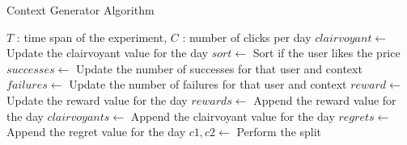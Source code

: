 \begin{algorithm}
	\caption{Context Generator Algorithm}
	\begin{algorithmic}[1]
		\renewcommand{\algorithmicrequire}{\textbf{Input:}}
		\REQUIRE $T$ : time span of the experiment, $C$ : number of clicks per day
		\STATE $clairvoyant \gets ${ Update the clairvoyant value for the day}
		\STATE $sort \gets ${ Sort if the user likes the price}
		\STATE $successes \gets ${ Update the number of successes for that user and context}
		\STATE $failures \gets ${ Update the number of failures for that user and context}
		\ENDFOR
		\STATE $reward \gets ${ Update the reward value for the day}
		\ENDFOR
		\STATE $rewards \gets ${ Append the reward value for the day}
		\STATE $clairvoyants \gets ${ Append the clairvoyant value for the day}
		\STATE $regrets \gets ${ Append the regret value for the day}
		\ENDFOR
		\STATE $c1, c2 \gets${ Perform the split}
		\ENDIF
		\ENDFOR
		\ENDFOR	
		\ENDIF
		\ENDFOR
	\end{algorithmic}
\end{algorithm}